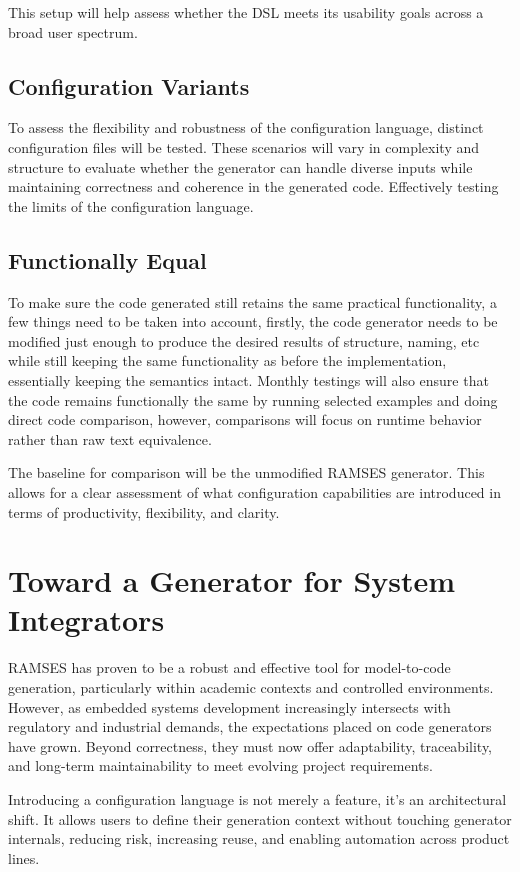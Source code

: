 This setup will help assess whether the DSL meets its usability goals across a broad user spectrum.

\subsection*{Configuration Variants}

To assess the flexibility and robustness of the configuration language, distinct configuration files will be tested. These scenarios will vary in complexity and structure to evaluate whether the generator can handle diverse inputs while maintaining correctness and coherence in the generated code. Effectively testing the limits of the configuration language.

\subsection*{Functionally Equal}

To make sure the code generated still retains the same practical functionality, a few things need to be taken into account, firstly, the code generator needs to be modified just enough to produce the desired results of structure, naming, etc while still keeping the same functionality as before the implementation, essentially keeping the semantics intact. Monthly testings will also ensure that the code remains functionally the same by running selected examples and doing direct code comparison, however, comparisons will focus on runtime behavior rather than raw text equivalence. 


The baseline for comparison will be the unmodified RAMSES generator. This allows for a clear assessment of what configuration capabilities are introduced in terms of productivity, flexibility, and clarity.


\section{Toward a Generator for System Integrators}
\label{sec:conclusion_configurable_generation}

RAMSES has proven to be a robust and effective tool for model-to-code generation, particularly within academic contexts and controlled environments. However, as embedded systems development increasingly intersects with regulatory and industrial demands, the expectations placed on code generators have grown. Beyond correctness, they must now offer adaptability, traceability, and long-term maintainability to meet evolving project requirements.

Introducing a configuration language is not merely a feature, it's an architectural shift. It allows users to define their generation context without touching generator internals, reducing risk, increasing reuse, and enabling automation across product lines.












